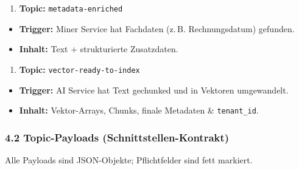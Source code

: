 \begin{enumerate}
\def\labelenumi{\arabic{enumi}.}
\setcounter{enumi}{3}
\tightlist
\item
  \textbf{Topic:} \texttt{metadata-enriched}
\end{enumerate}

\begin{itemize}
\tightlist
\item
  \textbf{Trigger:} Miner Service hat Fachdaten (z.\,B. Rechnungsdatum)
  gefunden.
\item
  \textbf{Inhalt:} Text + strukturierte Zusatzdaten.
\end{itemize}

\begin{enumerate}
\def\labelenumi{\arabic{enumi}.}
\setcounter{enumi}{4}
\tightlist
\item
  \textbf{Topic:} \texttt{vector-ready-to-index}
\end{enumerate}

\begin{itemize}
\tightlist
\item
  \textbf{Trigger:} AI Service hat Text gechunked und in Vektoren
  umgewandelt.
\item
  \textbf{Inhalt:} Vektor-Arrays, Chunks, finale Metadaten \&
  \texttt{tenant\_id}.
\end{itemize}

\subsubsection{4.2 Topic-Payloads
(Schnittstellen-Kontrakt)}\label{topic-payloads-schnittstellen-kontrakt}

Alle Payloads sind JSON-Objekte; Pflichtfelder sind fett markiert.

